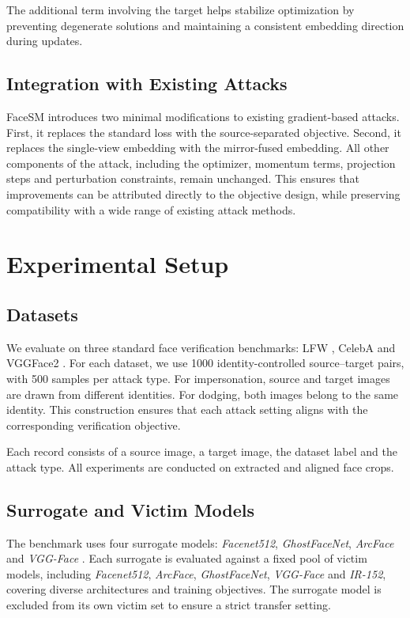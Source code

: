 \documentclass[a4paper,fleqn]{cas-dc}
\begin{document}
The additional term involving the target helps stabilize optimization by preventing degenerate solutions and maintaining a consistent embedding direction during updates.

\subsection{Integration with Existing Attacks}
FaceSM introduces two minimal modifications to existing gradient-based attacks. First, it replaces the standard loss with the source-separated objective. Second, it replaces the single-view embedding with the mirror-fused embedding. All other components of the attack, including the optimizer, momentum terms, projection steps and perturbation constraints, remain unchanged. This ensures that improvements can be attributed directly to the objective design, while preserving compatibility with a wide range of existing attack methods.

\section{Experimental Setup}

\subsection{Datasets}
We evaluate on three standard face verification benchmarks: LFW \citet{huang2008labeled}, CelebA \citet{liu2015deep} and VGGFace2 \citet{cao2018vggface2}. For each dataset, we use 1000 identity-controlled source--target pairs, with 500 samples per attack type. For impersonation, source and target images are drawn from different identities. For dodging, both images belong to the same identity. This construction ensures that each attack setting aligns with the corresponding verification objective. 

Each record consists of a source image, a target image, the dataset label and the attack type. All experiments are conducted on extracted and aligned face crops.

\subsection{Surrogate and Victim Models}
The benchmark uses four surrogate models: \textit{Facenet512}, \textit{GhostFaceNet}, \textit{ArcFace} and \textit{VGG-Face} \citet{schroff2015facenet,deng2019arcface,alansari2023ghostfacenets,parkhi2015deep}. Each surrogate is evaluated against a fixed pool of victim models, including \textit{Facenet512}, \textit{ArcFace}, \textit{GhostFaceNet}, \textit{VGG-Face} and \textit{IR-152}, covering diverse architectures and training objectives. The surrogate model is excluded from its own victim set to ensure a strict transfer setting.
\end{document}
